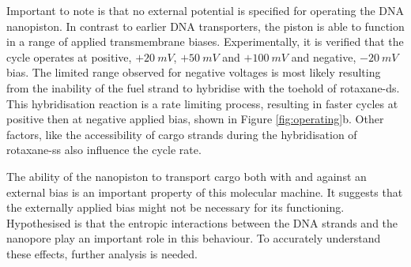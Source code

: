 Important to note is that no external potential is specified for operating the DNA
nanopiston. In contrast to earlier DNA transporters, the piston is able to function in a
range of applied transmembrane biases. Experimentally, it is verified that the
cycle operates at positive, $+20\ mV$, $+50\ mV$ and $+100\ mV$ and negative, $ - 20\
mV$ bias. The limited range observed for negative voltages is most likely resulting from
the
inability of the fuel strand to hybridise with the toehold of rotaxane-ds. This
hybridisation reaction is a rate limiting process, resulting in faster cycles at positive
then at negative applied bias, shown in Figure \ref{fig:operating}b. Other factors, like
the accessibility of cargo strands during the hybridisation of rotaxane-ss also influence
the cycle rate.

The ability of the nanopiston to transport cargo both with and against an external bias
is an important property of this molecular machine. It suggests that the externally
applied bias might not be necessary for its functioning. Hypothesised is that the
entropic
interactions between the DNA strands and the nanopore play an important
role in this behaviour. To accurately understand these effects, further analysis is
needed.

